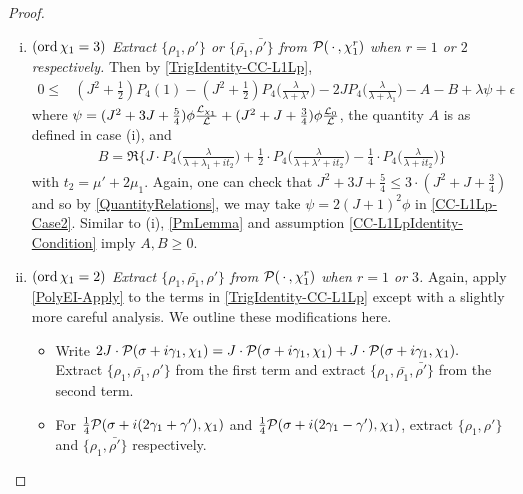 \documentclass[12pt,psamsfonts]{amsart}
\theoremstyle{definition}
\theoremstyle{remark}
\numberwithin{equation}{section}
\begin{document}
\begin{proof}
\begin{enumerate}[(i)]
	
	\item $(\mathrm{ord}\, \chi_1 = 3)$ \emph{Extract $\{\rho_1, \rho'\}$ or $\{\bar{\rho_1}, \bar{\rho'}\}$ from $\mathcal{P}( \, \cdot \, , \chi_1^r)$ when $r=1$ or $2$ respectively.} Then by \eqref{TrigIdentity-CC-L1Lp}, 
	\begin{equation}
	\begin{aligned}
	0 \leq & (J^2+\tfrac{1}{2}) P_4(1) -  (J^2+\tfrac{1}{2}) P_4\big( \frac{\lambda}{\lambda+\lambda'} \big) - 2J P_4\big( \frac{\lambda}{\lambda+\lambda_1}\big) - A - B +  \lambda \psi + \epsilon 
	\end{aligned}
	\label{CC-L1Lp-Case2}
	\end{equation}
	where $\psi = (J^2 + 3J + \tfrac{5}{4}) \phi \tfrac{\mathcal{L}_{\chi_1}}{\mathcal{L}} + (J^2 + J + \tfrac{3}{4}) \phi \tfrac{\mathcal{L}_0}{\mathcal{L}}$, the quantity $A$ is as defined in case (i), and
	\begin{align*}
	B = \Re\Big\{ J \cdot P_4\big( \frac{\lambda}{\lambda+\lambda_1+it_2} \big) + \tfrac{1}{2} \cdot P_4\big( \frac{\lambda}{\lambda+\lambda' + it_2}\big)- \tfrac{1}{4} \cdot P_4\big( \frac{\lambda}{\lambda+it_2}\big)\Big\}
	\end{align*}
	with $t_2 = \mu' + 2\mu_1$. Again, one can check that $J^2 + 3J+\tfrac{5}{4} \leq 3 \cdot(J^2 + J +\tfrac{3}{4})$ and so by \cref{QuantityRelations}, we may take $\psi =  2(J+1)^2 \phi$ in \eqref{CC-L1Lp-Case2}. Similar to (i), \cref{PmLemma} and assumption \eqref{CC-L1LpIdentity-Condition} imply $A, B \geq 0$. 
	
	\item $(\mathrm{ord}\, \chi_1 = 2)$ \emph{Extract $\{\rho_1, \bar{\rho_1}, \rho'\}$ from $\mathcal{P}( \, \cdot \, , \chi_1^r)$ when $r=1$ or $3$.}
	Again, apply \cref{PolyEI-Apply} to the terms in \eqref{TrigIdentity-CC-L1Lp} except with a slightly more careful analysis. We outline these modifications here. 
		\begin{itemize}
			\item Write  $2J \cdot \mathcal{P}(\sigma+i\gamma_1,\chi_1) = J \cdot \mathcal{P}(\sigma+i\gamma_1,\chi_1) + J \cdot \mathcal{P}(\sigma+i\gamma_1, \chi_1).$  Extract $\{\rho_ 1, \bar{\rho_1}, \rho'\}$ from the first term and extract  $\{\rho_1, \bar{\rho_1}, \bar{\rho'}\}$ from the second term.
			\item For $\tfrac{1}{4} \mathcal{P}(\sigma + i(2\gamma_1+\gamma'), \chi_1)$ and  $\tfrac{1}{4} \mathcal{P}(\sigma + i(2\gamma_1-\gamma'), \chi_1)$, extract $\{\rho_1,  \rho'\}$ and $\{\rho_1,  \bar{\rho'}\}$ respectively.
		\end{itemize}
		



\end{enumerate}
\end{proof}
\end{document}
